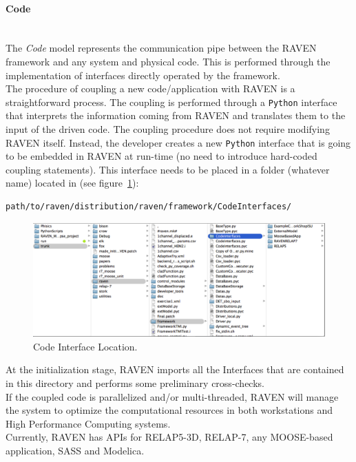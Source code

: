 \paragraph{Code} ~\\
The \textit{Code} model represents the communication pipe between the RAVEN framework and any system and physical code. This is performed through the implementation of interfaces directly operated by the framework.
\\The procedure of coupling a new code/application with RAVEN is a straightforward process. The coupling is performed through a \texttt{Python}  interface that interprets the information coming from RAVEN and translates them to the input of the driven code. The coupling procedure does not require modifying RAVEN itself. Instead, the developer creates a new \texttt{Python} interface that is going to be embedded in RAVEN at run-time (no need to introduce hard-coded coupling statements).  This interface needs to be placed in a folder (whatever name) located in (see figure~\ref{fig:CodeInterfaceLocation}):
\begin{lstlisting}[language=bash]
 path/to/raven/distribution/raven/framework/CodeInterfaces/
\end{lstlisting}

\begin{figure}
  \centering
  \includegraphics[width=1\textwidth]  {pics/CodeInterfaceLocation.png}
  \caption{Code Interface Location.}
  \label{fig:CodeInterfaceLocation}
\end{figure}
At the initialization stage, RAVEN imports all the Interfaces that are contained in this directory and performs some preliminary cross-checks.
\\ If the coupled code is parallelized and/or multi-threaded, RAVEN will manage the system to optimize the computational resources in both workstations and High Performance Computing systems.
\\Currently, RAVEN has APIs for RELAP5-3D, RELAP-7, any MOOSE-based application, SASS and Modelica.
